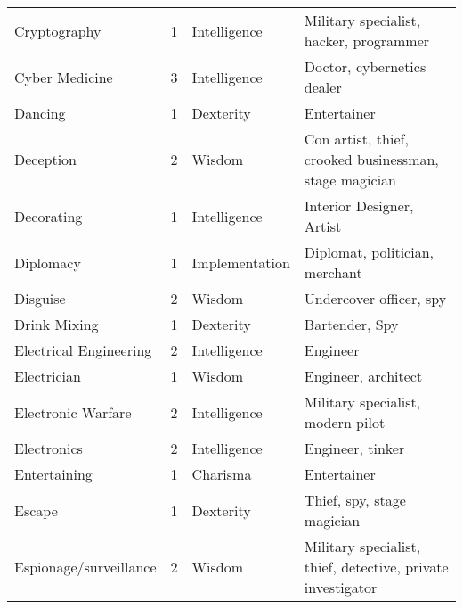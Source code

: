 \documentclass[twoside]{book}
\begin{document}
\begin{longtable}{p{1.25in}llp{12em}}
  \raggedright
           Cryptography 
  &
   1 
  &
   Intelligence 
  &
   Military specialist,
           hacker, programmer 
  \tabularnewline
      
  \raggedright
           Cyber Medicine 
  &
   3 
  &
   Intelligence 
  &
   Doctor, cybernetics
           dealer 
  \tabularnewline
      
  \raggedright
           Dancing 
  &
   1 
  &
   Dexterity 
  &
   Entertainer 
  \tabularnewline
      
  \raggedright
           Deception 
  &
   2 
  &
   Wisdom 
  &
   Con artist, thief,
           crooked businessman, stage magician 
  \tabularnewline
      
  \raggedright
           Decorating 
  &
   1 
  &
   Intelligence 
  &
   Interior Designer, Artist
           
  \tabularnewline
      
  \raggedright
           Diplomacy 
  &
   1 
  &
   Implementation 
  &
   Diplomat, politician,
           merchant 
  \tabularnewline
      
  \raggedright
           Disguise 
  &
   2 
  &
   Wisdom 
  &
   Undercover officer, spy
           
  \tabularnewline
      
  \raggedright
           Drink Mixing 
  &
   1 
  &
   Dexterity 
  &
   Bartender, Spy 
  \tabularnewline
      
  \raggedright
           Electrical Engineering 
  &
   2 
  &
   Intelligence 
  &
   Engineer 
  \tabularnewline
      
  \raggedright
           Electrician 
  &
   1 
  &
   Wisdom 
  &
   Engineer, architect
           
  \tabularnewline
      
  \raggedright
           Electronic Warfare 
  &
   2 
  &
   Intelligence 
  &
   Military specialist,
           modern pilot 
  \tabularnewline
      
  \raggedright
           Electronics 
  &
   2 
  &
   Intelligence 
  &
   Engineer, tinker 
  \tabularnewline
      
  \raggedright
           Entertaining 
  &
   1 
  &
   Charisma 
  &
   Entertainer 
  \tabularnewline
      
  \raggedright
           Escape 
  &
   1 
  &
   Dexterity 
  &
   Thief, spy, stage
           magician 
  \tabularnewline
      
  \raggedright
           Espionage/surveillance 
  &
   2 
  &
   Wisdom 
  &
   Military specialist,
           thief, detective, private investigator 
  \tabularnewline
      

\end{longtable}
\end{document}
